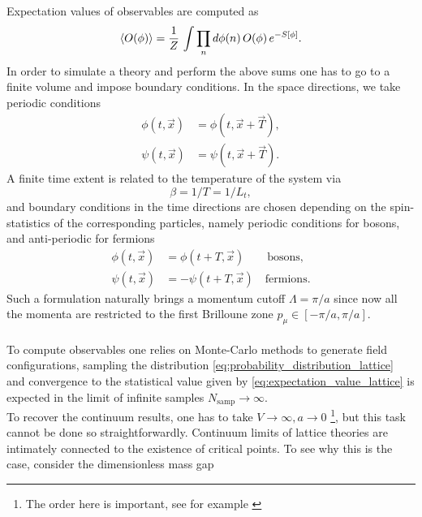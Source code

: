 Expectation values of observables are computed as
\begin{equation}
    \left\langle O(\phi) \right\rangle  = \frac{1}{Z} \, \int \prod_n d\phi(n) \, O(\phi) \, e^{-S[\phi]}.
    \label{eq:expectation_value_lattice}
\end{equation}
In order to simulate a theory and perform the above sums one has to go to a finite volume and impose boundary conditions. In the space directions, we take periodic conditions 
\begin{equation*}
    \begin{aligned}
        \phi(t, \vec x) &= \phi(t, \vec x + \vec T), \\
        \psi(t, \vec x) &= \psi(t, \vec x + \vec T).
    \end{aligned}
\end{equation*}
A finite time extent is related to the temperature of the system \cite{le_bellac_1996,rothe_LGT} via
\begin{equation*}
    \beta = 1/T = 1/L_t,
\end{equation*}
and boundary conditions in the time directions are chosen depending on the spin-statistics of the corresponding particles, namely periodic conditions for bosons, and anti-periodic for fermions
\begin{equation*}
    \begin{aligned}
        \phi(t, \vec x) &= \phi(t + T, \vec x) \qquad \text{bosons}, \\
        \psi(t, \vec x) &= -\psi(t + T, \vec x) \quad \text{fermions}.
    \end{aligned}
\end{equation*}
Such a formulation naturally brings a momentum cutoff $\Lambda = \pi/a$ since now all the momenta are restricted to the first Brilloune zone $p_\mu \in [-\pi/a, \pi/a]$. \\~\\
To compute observables one relies on Monte-Carlo methods to generate field configurations, sampling the distribution \eqref{eq:probability_distribution_lattice} and convergence to the statistical value given by \eqref{eq:expectation_value_lattice} is expected in the limit of infinite samples $N_\text{samp} \to \infty$. \\
To recover the continuum results, one has to take $V \to \infty, a \to 0$ \footnote{The order here is important, see for example \cite{seiler,friedli_velenik_2017}}, but this task cannot be done so straightforwardly.
Continuum limits of lattice theories are intimately connected to the existence of critical points. To see why this is the case, consider the dimensionless mass gap 
